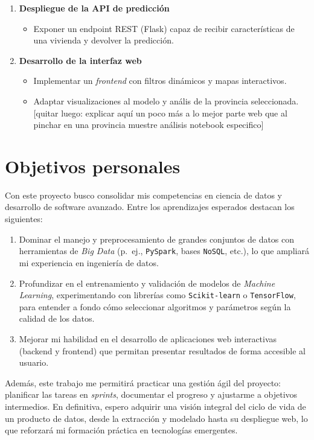 \documentclass[a4paper,11pt]{book}
\begin{document}
\begin{enumerate}
    \item \textbf{Despliegue de la API de predicción}
    \begin{itemize}
        \item Exponer un endpoint REST (Flask) capaz de recibir características de una vivienda y devolver la predicción.
    \end{itemize}

    \item \textbf{Desarrollo de la interfaz web}
    \begin{itemize}
        \item Implementar un \textit{frontend} con filtros dinámicos y mapas interactivos.
        \item Adaptar visualizaciones al modelo y anális de la provincia seleccionada. [quitar luego: explicar aquí un poco más a lo mejor parte web que al pinchar en una provincia muestre análisis notebook especifico]
    \end{itemize}
\end{enumerate}

\section{Objetivos personales}
Con este proyecto busco consolidar mis competencias en ciencia de datos y desarrollo de software avanzado. Entre los aprendizajes esperados destacan los siguientes:

\begin{enumerate}
  \item Dominar el manejo y preprocesamiento de grandes conjuntos de datos con herramientas de \textit{Big Data} (p.\ ej., \texttt{PySpark}, bases \texttt{NoSQL}, etc.), lo que ampliará mi experiencia en ingeniería de datos.
  \item Profundizar en el entrenamiento y validación de modelos de \textit{Machine Learning}, experimentando con librerías como \texttt{Scikit-learn} o \texttt{TensorFlow}, para entender a fondo cómo seleccionar algoritmos y parámetros según la calidad de los datos.
  \item Mejorar mi habilidad en el desarrollo de aplicaciones web interactivas (backend y frontend) que permitan presentar resultados de forma accesible al usuario.
\end{enumerate}

Además, este trabajo me permitirá practicar una gestión ágil del proyecto: planificar las tareas en \textit{sprints}, documentar el progreso y ajustarme a objetivos intermedios. En definitiva, espero adquirir una visión integral del ciclo de vida de un producto de datos, desde la extracción y modelado hasta su despliegue web, lo que reforzará mi formación práctica en tecnologías emergentes.
\end{document}
